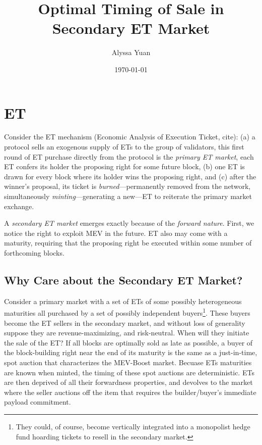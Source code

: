 \documentclass[a4paper,11pt]{article}
\title{Optimal Timing of Sale in Secondary ET Market}
\author{Alyssa Yuan}
\date{\today}
\begin{document}
\maketitle
\section{ET}
Consider the ET mechanism (Economic Analysis of Execution Ticket, cite): (a) a protocol sells an exogenous supply of ETs to the group of validators, this first round of ET purchase directly from the protocol is the \textit{primary ET market}, each ET confers its holder the proposing right for some future block, (b) one ET is drawn for every block where its holder wins the proposing right, and (c) after the winner's proposal, its ticket is \textit{burned}---permanently removed from the network, simultaneously \textit{minting}---generating a new---ET to reiterate the primary market exchange. 

A \textit{secondary ET market} emerges exactly because of the \textit{forward nature}. First, we notice the right to exploit MEV in the future. ET also may come with a maturity, requiring that the proposing right be executed within some number of forthcoming blocks. 
\subsection{Why Care about the Secondary ET Market?}
Consider a primary market with a set of ETs of some possibly heterogeneous maturities all purchased by a set of possibly independent buyers\footnote{They could, of course, become vertically integrated into a monopolist hedge fund hoarding tickets to resell in the secondary market.}. These buyers become the ET sellers in the secondary market, and without loss of generality suppose they are revenue-maximizing, and risk-neutral. When will they initiate the sale of the ET? If all blocks are optimally sold as late as possible, a buyer of the block-building right near the end of its maturity is the same as a just-in-time, spot auction that characterizes the MEV-Boost market. Becuase ETs maturities are known when minted, the timing of these spot auctions are deterministic. ETs are then deprived of all their forwardness properties, and devolves to the market where the seller auctions off the item that requires the builder/buyer's immediate payload commitment. 
\end{document}
